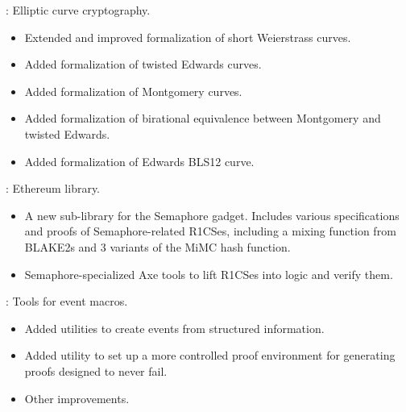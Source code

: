 
\begin{frame}

\implibtitle

:
Elliptic curve cryptography.
\begin{itemize}
\item Extended and improved formalization of short Weierstrass curves.
\item Added formalization of twisted Edwards curves.
\item Added formalization of Montgomery curves.
\item Added formalization of birational equivalence between
      Montgomery and twisted Edwards.
\item Added formalization of Edwards BLS12 curve.
\end{itemize}

\end{frame}


\begin{frame}

\implibtitle

:
Ethereum library.
\begin{itemize}
\item A new sub-library for the Semaphore gadget.  Includes various
specifications and proofs of Semaphore-related R1CSes, including a
mixing function from BLAKE2s and 3 variants of the MiMC hash function.
\item Semaphore-specialized Axe tools to lift R1CSes into logic and
verify them.
\end{itemize}

\end{frame}


\begin{frame}

\implibtitle

:
Tools for event macros.
\begin{itemize}
\item Added utilities to create events from structured information.
\item Added utility to set up a more controlled proof environment
      for generating proofs designed to never fail.
\item Other improvements.
\end{itemize}

\end{frame}

